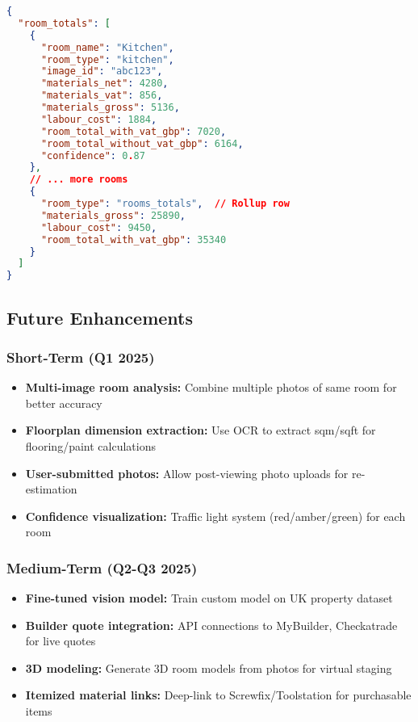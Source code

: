\documentclass[11pt,a4paper]{article}
\begin{document}
\begin{lstlisting}[language=JSON, caption=room\_totals Structure]
{
  "room_totals": [
    {
      "room_name": "Kitchen",
      "room_type": "kitchen",
      "image_id": "abc123",
      "materials_net": 4280,
      "materials_vat": 856,
      "materials_gross": 5136,
      "labour_cost": 1884,
      "room_total_with_vat_gbp": 7020,
      "room_total_without_vat_gbp": 6164,
      "confidence": 0.87
    },
    // ... more rooms
    {
      "room_type": "rooms_totals",  // Rollup row
      "materials_gross": 25890,
      "labour_cost": 9450,
      "room_total_with_vat_gbp": 35340
    }
  ]
}
\end{lstlisting}

\subsection{Future Enhancements}

\subsubsection{Short-Term (Q1 2025)}
\begin{itemize}
  \item \textbf{Multi-image room analysis:} Combine multiple photos of same room for better accuracy
  \item \textbf{Floorplan dimension extraction:} Use OCR to extract sqm/sqft for flooring/paint calculations
  \item \textbf{User-submitted photos:} Allow post-viewing photo uploads for re-estimation
  \item \textbf{Confidence visualization:} Traffic light system (red/amber/green) for each room
\end{itemize}

\subsubsection{Medium-Term (Q2-Q3 2025)}
\begin{itemize}
  \item \textbf{Fine-tuned vision model:} Train custom model on UK property dataset
  \item \textbf{Builder quote integration:} API connections to MyBuilder, Checkatrade for live quotes
  \item \textbf{3D modeling:} Generate 3D room models from photos for virtual staging
  \item \textbf{Itemized material links:} Deep-link to Screwfix/Toolstation for purchasable items
\end{itemize}
\end{document}

